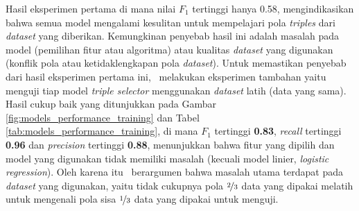 
Hasil eksperimen pertama di mana nilai $F_1$ tertinggi hanya 0.58, mengindikasikan bahwa semua model mengalami kesulitan untuk mempelajari pola \textit{triples} dari \textit{dataset} yang diberikan. Kemungkinan penyebab hasil ini adalah masalah pada model (pemilihan fitur atau algoritma) atau kualitas \textit{dataset} yang digunakan (konflik pola atau ketidaklengkapan pola \textit{dataset}). Untuk memastikan penyebab dari hasil eksperimen pertama ini, \saya~melakukan eksperimen tambahan yaitu menguji tiap model \textit{triple selector} menggunakan \textit{dataset} latih (data yang sama). Hasil cukup baik yang ditunjukkan pada Gambar \ref{fig:models_performance_training} dan Tabel \ref{tab:models_performance_training}, di mana $F_1$ tertinggi \textbf{0.83}, \textit{recall} tertinggi \textbf{0.96} dan \textit{precision} tertinggi \textbf{0.88}, menunjukkan bahwa fitur yang dipilih dan model yang digunakan tidak memiliki masalah (kecuali model linier, \textit{logistic regression}). Oleh karena itu \saya~berargumen bahwa masalah utama terdapat pada \textit{dataset} yang digunakan, yaitu tidak cukupnya pola $\nicefrac{2}{3}$ data yang dipakai melatih untuk mengenali pola sisa $\nicefrac{1}{3}$ data yang dipakai untuk menguji.

